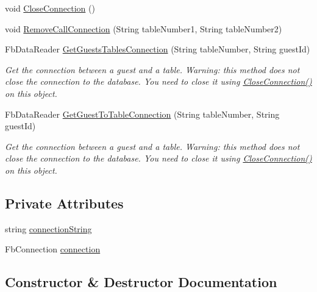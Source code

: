 \begin{DoxyCompactItemize}
void \hyperlink{class_e_l_i_server_test_1_1_test_database_helper_ae1ec2aaa4d83ed9f63a02844ec32600e}{Close\+Connection} ()
\item 
void \hyperlink{class_e_l_i_server_test_1_1_test_database_helper_a06e042831161a455831dc8148fa4a70d}{Remove\+Call\+Connection} (String table\+Number1, String table\+Number2)
\item 
Fb\+Data\+Reader \hyperlink{class_e_l_i_server_test_1_1_test_database_helper_a3b612109e388d96caf2444552db9d0e3}{Get\+Guests\+Tables\+Connection} (String table\+Number, String guest\+Id)
\begin{DoxyCompactList}\small\item\em Get the connection between a guest and a table. Warning\+: this method does not close the connection to the database. You need to close it using \hyperlink{class_e_l_i_server_test_1_1_test_database_helper_ae1ec2aaa4d83ed9f63a02844ec32600e}{Close\+Connection()} on this object. \end{DoxyCompactList}\item 
Fb\+Data\+Reader \hyperlink{class_e_l_i_server_test_1_1_test_database_helper_aed83bc14862f6b5b0ecc61ffb9ad89bd}{Get\+Guest\+To\+Table\+Connection} (String table\+Number, String guest\+Id)
\begin{DoxyCompactList}\small\item\em Get the connection between a guest and a table. Warning\+: this method does not close the connection to the database. You need to close it using \hyperlink{class_e_l_i_server_test_1_1_test_database_helper_ae1ec2aaa4d83ed9f63a02844ec32600e}{Close\+Connection()} on this object. \end{DoxyCompactList}\end{DoxyCompactItemize}
\subsection*{Private Attributes}
\begin{DoxyCompactItemize}
\item 
string \hyperlink{class_e_l_i_server_test_1_1_test_database_helper_a68c640584a57eaf87cf2c29950a2e19a}{connection\+String}
\item 
Fb\+Connection \hyperlink{class_e_l_i_server_test_1_1_test_database_helper_a4f6ef15321f9ce2e1ad311df36dd84d4}{connection}
\end{DoxyCompactItemize}


\subsection{Constructor \& Destructor Documentation}
\mbox{\label{class_e_l_i_server_test_1_1_test_database_helper_a155438b527497514f6e5fcb8c691b865}} 
